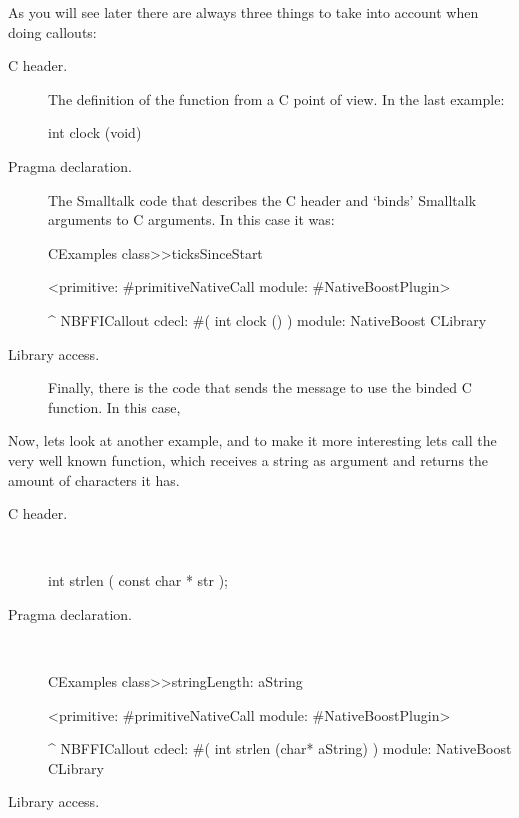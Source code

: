 \documentclass[a4paper,10pt,twoside]{book}
\begin{document}
As you will
see later there are always three things to take into account when doing
callouts:

\begin{description}
\item [C header.] The definition of the function from a C point of view. In the last example:

\begin{code}{}
int clock (void)
\end{code}

\item [Pragma declaration.] The Smalltalk code that describes the C header and `binds' Smalltalk arguments to C arguments. In this case it was:

\begin{code}{}
CExamples class>>ticksSinceStart

<primitive: #primitiveNativeCall module: #NativeBoostPlugin>
	
^ NBFFICallout cdecl: #( int clock () ) module: NativeBoost CLibrary
\end{code}


\item [Library access.] Finally, there is the code that sends the message to use the binded C function. In this case, 




\end{description}


Now, lets look at another example, and to make it more interesting lets call the very well known  function, which receives a string as argument and returns the amount of characters it has. 


\begin{description}
\item [C header.] \ 

\begin{code}{}
int strlen ( const char * str );
\end{code}

\item [Pragma declaration.] \ 

\begin{code}{}
CExamples class>>stringLength: aString

	<primitive: #primitiveNativeCall module: #NativeBoostPlugin>
	
	^ NBFFICallout cdecl: #( int strlen (char* aString) ) module: NativeBoost CLibrary
\end{code}


\item [Library access.] \ 
 

\end{description}
\end{document}
